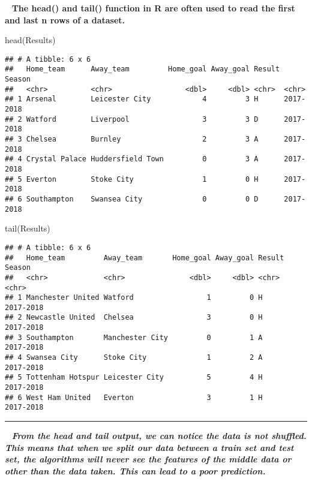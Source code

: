 \documentclass[
]{article}
\newenvironment{Shaded}{\begin{snugshade}}{\end{snugshade}}
\newcommand{\FunctionTok}[1]{\textcolor[rgb]{0.00,0.00,0.00}{#1}}
\newcommand{\NormalTok}[1]{#1}
\begin{document}
~ \textbf{The head() and tail() function in R are often used to read the
first and last n rows of a dataset.}

\begin{Shaded}
\begin{Highlighting}[]
\FunctionTok{head}\NormalTok{(Results)}
\end{Highlighting}
\end{Shaded}

\begin{verbatim}
## # A tibble: 6 x 6
##   Home_team      Away_team         Home_goal Away_goal Result Season   
##   <chr>          <chr>                 <dbl>     <dbl> <chr>  <chr>    
## 1 Arsenal        Leicester City            4         3 H      2017-2018
## 2 Watford        Liverpool                 3         3 D      2017-2018
## 3 Chelsea        Burnley                   2         3 A      2017-2018
## 4 Crystal Palace Huddersfield Town         0         3 A      2017-2018
## 5 Everton        Stoke City                1         0 H      2017-2018
## 6 Southampton    Swansea City              0         0 D      2017-2018
\end{verbatim}

\begin{Shaded}
\begin{Highlighting}[]
\FunctionTok{tail}\NormalTok{(Results)}
\end{Highlighting}
\end{Shaded}

\begin{verbatim}
## # A tibble: 6 x 6
##   Home_team         Away_team       Home_goal Away_goal Result Season   
##   <chr>             <chr>               <dbl>     <dbl> <chr>  <chr>    
## 1 Manchester United Watford                 1         0 H      2017-2018
## 2 Newcastle United  Chelsea                 3         0 H      2017-2018
## 3 Southampton       Manchester City         0         1 A      2017-2018
## 4 Swansea City      Stoke City              1         2 A      2017-2018
## 5 Tottenham Hotspur Leicester City          5         4 H      2017-2018
## 6 West Ham United   Everton                 3         1 H      2017-2018
\end{verbatim}

\begin{center}\rule{0.5\linewidth}{0.5pt}\end{center}

~ \textbf{\emph{From the head and tail output, we can notice the data is
not shuffled. This means that when we split our data between a train set
and test set, the algorithms will never see the features of the middle
data or other than the data taken. This can lead to a poor prediction.}}
\end{document}
